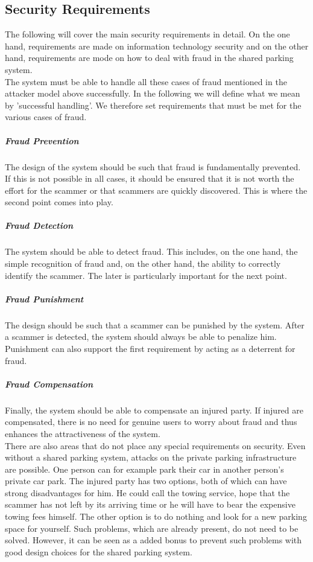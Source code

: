 \documentclass[
a4paper,     %
titlepage,   %
14pt         %
]{scrartcl}  %
\theoremstyle{mystyle}
\begin{document}
\subsection{Security Requirements}
The following will cover the main security requirements in detail. On the one hand, requirements are made on information technology security and on the other hand, requirements are mode on how to deal with fraud in the shared parking system. \\

The system must be able to handle all these cases of fraud mentioned in the attacker model above successfully. In the following we will define what we mean by 'successful handling'. We therefore set requirements that must be met for the various cases of fraud.
\subparagraph{Fraud Prevention} The design of the system should be such that fraud is fundamentally prevented. If this is not possible in all cases, it should be ensured that it is not worth the effort for the scammer or that scammers are quickly discovered. This is where the second point comes into play.
\subparagraph{Fraud Detection} The system should be able to detect fraud. This includes, on the one hand, the simple recognition of fraud and, on the other hand, the ability to correctly identify the scammer. The later is particularly important for the next point.
\subparagraph{Fraud Punishment} The design should be such that a scammer can be punished by the system. After a scammer is detected, the system should always be able to penalize him. Punishment can also support the first requirement by acting as a deterrent for fraud.
\subparagraph{Fraud Compensation} Finally, the system should be able to compensate an injured party. If injured are compensated, there is no need for genuine users to worry about fraud and thus enhances the attractiveness of the system.\\

There are also areas that do not place any special requirements on security. Even without a shared parking system, attacks on the private parking infrastructure are possible. One person can for example park their car in another person's private car park. The injured party has two options, both of which can have strong disadvantages for him. He could call the towing service, hope that the scammer has not left by its arriving time or he will have to bear the expensive towing fees himself. The other option is to do nothing and look for a new parking space for yourself. Such problems, which are already present, do not need to be solved. However, it can be seen as a added bonus to prevent such problems with good design choices for the shared parking system.
\end{document}
